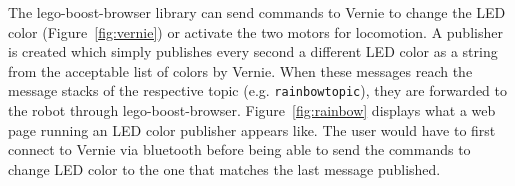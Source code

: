         The \textsf{lego-boost-browser} library can send commands to Vernie to change the \ac{LED} color (Figure~\ref{fig:vernie}) or activate the two motors for locomotion. A publisher is created which simply publishes every second a different \ac{LED} color as a string from the acceptable list of colors by Vernie. When these messages reach the message stacks of the respective topic (e.g. \texttt{rainbow\smallunderscore topic}), they are forwarded to the robot through \textsf{lego-boost-browser}. Figure~\ref{fig:rainbow} displays what a web page running an \ac{LED} color publisher appears like. The user would have to first connect to Vernie via bluetooth before being able to send the commands to change \ac{LED} color to the one that matches the last message published. 

